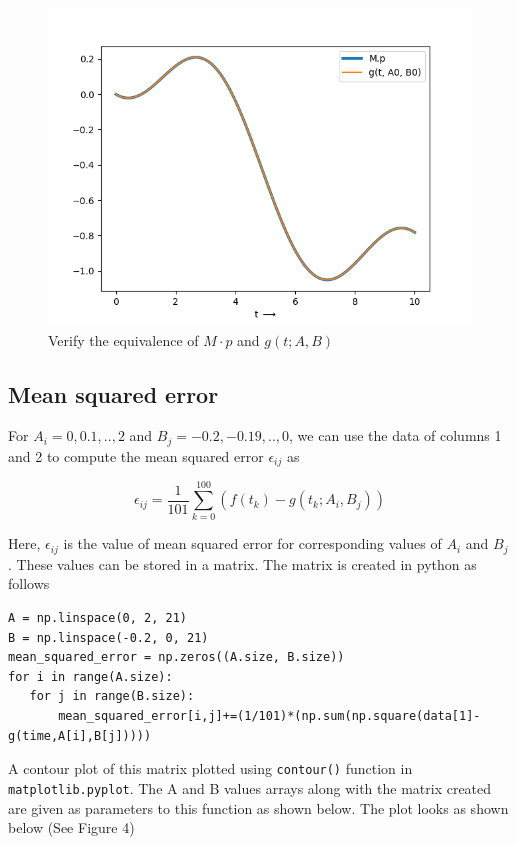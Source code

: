\documentclass[12pt, a4paper]{report}
\begin{document}
  \begin{figure}[H]
 \centering
	\includegraphics[scale=0.8]{Figure_3.png}  %
	\caption{Verify the equivalence of $M \cdot p$ and $g(t;A,B)$}
	\label{fig3}
 \end{figure}
 
 \subsection*{Mean squared error}
 For $A_i = 0,0.1,..,2$ and $B_j = -0.2,-0.19,..,0$, we can use the data of columns 1 and 2 to compute the mean squared error $\epsilon_{ij}$ as
 
 \begin{equation*}
 \epsilon_{ij} = \frac{1}{101} \sum_{k=0}^{100} (f(t_k)-g(t_k;A_i,B_j))
 \end{equation*}
 
 Here, $\epsilon_{ij}$ is the value of mean squared error for corresponding values of $A_i$ and $B_j$. These values can be stored in a matrix. The matrix is created in python as follows
 
\begin{lstlisting}
A = np.linspace(0, 2, 21)
B = np.linspace(-0.2, 0, 21)
mean_squared_error = np.zeros((A.size, B.size))
for i in range(A.size):
   for j in range(B.size):
       mean_squared_error[i,j]+=(1/101)*(np.sum(np.square(data[1]-g(time,A[i],B[j]))))
\end{lstlisting}

 A contour plot of this matrix plotted using \texttt{contour()} function in \\ \texttt{matplotlib.pyplot}. The A and B values arrays along with the matrix created are given as parameters to this function as shown below. The plot looks as shown below (See Figure 4)
 
\end{document}
